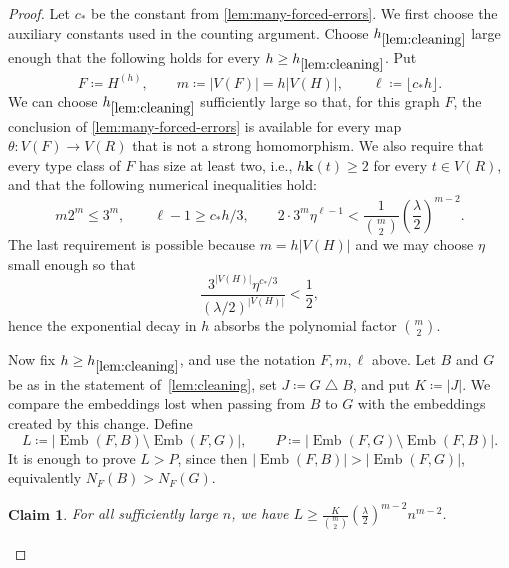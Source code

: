\documentclass[10pt]{article}
\theoremstyle{plain}
\newtheorem{claim}[claim]{Claim}
\theoremstyle{remark}
\DeclareMathOperator{\Emb}{Emb}
\newcommand{\symdiff}{\mathbin{\triangle}}
\begin{document}
\begin{proof}
Let $c_*$ be the constant from \cref{lem:many-forced-errors}. We first choose the auxiliary constants used in the counting argument.
Choose $h_{\ref{lem:cleaning}}$ large enough that the following holds for every $h\ge h_{\ref{lem:cleaning}}$. Put
\[
        F\coloneqq H^{(h)},\qquad
        m\coloneqq |V(F)|=h|V(H)|,\qquad
        \ell\coloneqq\lfloor c_*h\rfloor.
\]
We can choose $h_{\ref{lem:cleaning}}$ sufficiently large so that, for this graph $F$, the conclusion of \cref{lem:many-forced-errors} is available for every map $\theta:V(F)\to V(R)$ that is not a strong homomorphism. We also require that every type class of $F$ has size at least two, i.e., $h\mathbf k(t)\ge2$ for every $t\in V(R)$, and that the following numerical inequalities hold:
\[
        m2^m\le3^m,
        \qquad
        \ell-1\ge c_*h/3,
        \qquad
        2\cdot 3^m\eta^{\ell-1}
        < \frac{1}{\binom m2}\left(\frac{\lambda}{2}\right)^{m-2}.
\]
The last requirement is possible because $m=h|V(H)|$ and we may choose $\eta$ small enough so that
\[
        \frac{3^{|V(H)|}\eta^{c_*/3}}
             {(\lambda/2)^{|V(H)|}}
             < \frac{1}{2},
\]
hence the exponential decay in $h$ absorbs the polynomial factor $\binom m2$.

Now fix $h\ge h_{\ref{lem:cleaning}}$, and use the notation $F,m,\ell$ above. Let $B$ and $G$ be as in the statement of~\cref{lem:cleaning}, set $J\coloneqq G\symdiff B$, and put $K\coloneqq |J|$.
We compare the embeddings lost when passing from $B$ to $G$ with the embeddings created by this change. Define
\[
        L\coloneqq |\Emb(F,B)\setminus\Emb(F,G)|,
        \qquad
        P\coloneqq |\Emb(F,G)\setminus\Emb(F,B)|.
\]
It is enough to prove $L>P$, since then $|\Emb(F,B)|>|\Emb(F,G)|$, equivalently $N_F(B)>N_F(G)$.

\begin{claim}
\label{claim:cleaning-loss-lower-bound}
For all sufficiently large $n$, we have $L\ge \frac{K}{\binom m2}\left(\frac{\lambda}{2}\right)^{m-2}n^{m-2}$.
\end{claim}


\end{proof}
\end{document}
